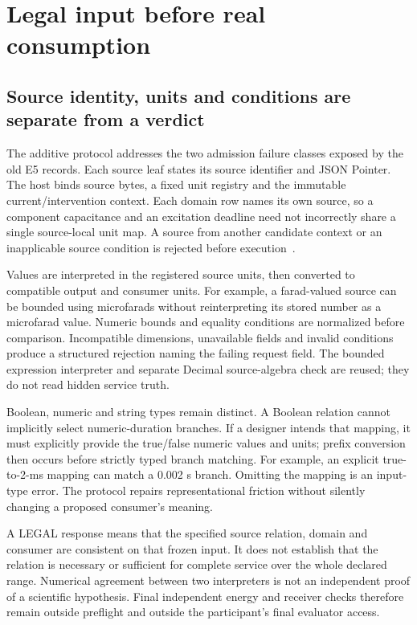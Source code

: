 \section{Legal input before real consumption}
\label{sec:abc-contract}
\subsection{Source identity, units and conditions are separate from a verdict}
The additive  protocol addresses the two admission
failure classes exposed by the old E5 records. Each source leaf states its
source identifier and JSON Pointer. The host binds source bytes, a fixed unit
registry and the immutable current/intervention context. Each domain row
names its own source, so a component capacitance and an excitation deadline
need not incorrectly share a single source-local unit map. A source from
another candidate context or an inapplicable source condition is rejected
before execution~\cite{gateways,abcfirst,abcaudit}.

Values are interpreted in the registered source units, then converted to
compatible output and consumer units. For example, a farad-valued source can
be bounded using microfarads without reinterpreting its stored number as a
microfarad value. Numeric bounds and equality conditions are normalized before
comparison. Incompatible dimensions, unavailable fields and invalid conditions
produce a structured rejection naming the failing request field. The bounded
expression interpreter and separate Decimal source-algebra check are reused;
they do not read hidden service truth.

Boolean, numeric and string types remain distinct. A Boolean relation cannot
implicitly select numeric-duration branches. If a designer intends that
mapping, it must explicitly provide the true/false numeric values and units;
prefix conversion then occurs before strictly typed branch matching. For
example, an explicit true-to-2-ms mapping can match a 0.002 s branch. Omitting
the mapping is an input-type error. The protocol repairs representational
friction without silently changing a proposed consumer's meaning.

A LEGAL response means that the specified source relation, domain and consumer
are consistent on that frozen input. It does not establish that the relation
is necessary or sufficient for complete service over the whole declared range.
Numerical agreement between two interpreters is not an independent proof of a
scientific hypothesis. Final independent energy and receiver checks therefore
remain outside preflight and outside the participant's final evaluator access.

